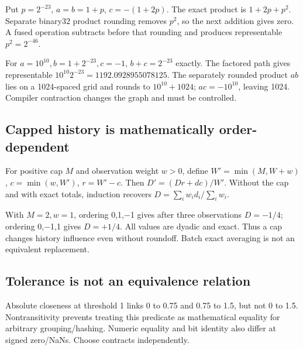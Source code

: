 \hypertarget{01-foundations-i-ch011-fma-witness-and-distributive-witness}{}

Put \(p=2^{-23}\), \(a=b=1+p\), \(c=-(1+2p)\). The exact product is \(1+2p+p^2\). Separate binary32 product rounding removes \(p^2\), so the next addition gives zero. A fused operation subtracts before that rounding and produces representable \(p^2=2^{-46}\).

For \(a=10^{10},b=1+2^{-23},c=-1\), \(b+c=2^{-23}\) exactly. The factored path gives representable \(10^{10}2^{-23}=1192.0928955078125\). The separately rounded product \(ab\) lies on a 1024-spaced grid and rounds to \(10^{10}+1024\); \(ac=-10^{10}\), leaving 1024. Compiler contraction changes the graph and must be controlled.

\subsection{Capped history is mathematically order-dependent}\label{01-foundations-i-ch011-capped-history-is-mathematically-order-dependent}

\hypertarget{01-foundations-i-ch011-capped-history-is-mathematically-order-dependent}{}

For positive cap \(M\) and observation weight \(w>0\), define \(W'=\min(M,W+w)\), \(c=\min(w,W')\), \(r=W'-c\). Then \(D'=(Dr+dc)/W'\). Without the cap and with exact totals, induction recovers \(D=\sum_iw_id_i/\sum_iw_i\).

With \(M=2,w=1\), ordering 0,1,−1 gives after three observations \(D=-1/4\); ordering 0,−1,1 gives \(D=+1/4\). All values are dyadic and exact. Thus a cap changes history influence even without roundoff. Batch exact averaging is not an equivalent replacement.

\subsection{Tolerance is not an equivalence relation}\label{01-foundations-i-ch011-tolerance-is-not-an-equivalence-relation}

\hypertarget{01-foundations-i-ch011-tolerance-is-not-an-equivalence-relation}{}

Absolute closeness at threshold 1 links 0 to 0.75 and 0.75 to 1.5, but not 0 to 1.5. Nontransitivity prevents treating this predicate as mathematical equality for arbitrary grouping/hashing. Numeric equality and bit identity also differ at signed zero/NaNs. Choose contracts independently.

